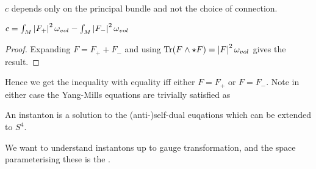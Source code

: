 \documentclass{article}
\begin{document}
\begin{prop}
	$c$ depends only on the principal bundle and not the choice of connection. 
\end{prop}
	
\begin{lemma}
	$c = \int_M \left\lvert F_+ \right\rvert^2 \omega_{vol} - \int_M \left\lvert F_- \right\rvert^2 \omega_{vol}$
\end{lemma}
\begin{proof}
Expanding $F = F_+ + F_-$ and using $\operatorname{Tr}(F \wedge \star F) = \left\lvert F \right\rvert^2 \omega_{vol}$ gives the result. 
\end{proof}
	
Hence we get the inequality 
with equality iff either $F= F_+$ or $F=F_-$. Note in either case the Yang-Mills equations are trivially satisfied as 

\begin{definition}
	An instanton is a solution to the (anti-)self-dual euqations which can be extended to $S^4$. 
\end{definition}

We want to understand instantons up to gauge transformation, and the space parameterising these is the . 



\end{document}

